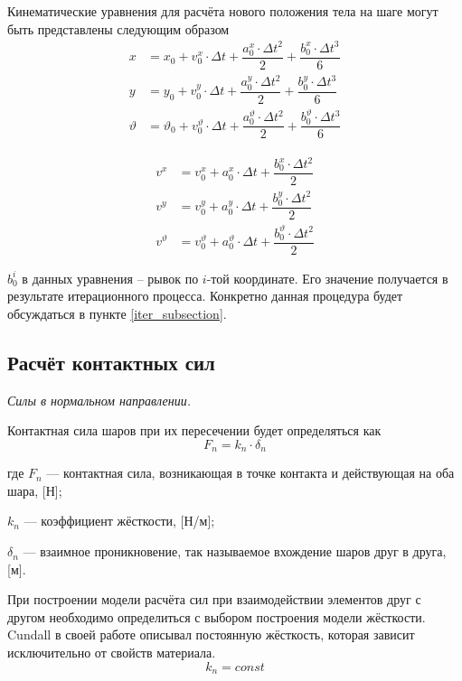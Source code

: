 \documentclass[utf8x, 14pt, oneside, a4paper]{article}
\begin{document}
Кинематические уравнения для расчёта нового положения тела на шаге могут быть представлены следующим образом
\begin{align}
x &= x_0 + v^x_0 \cdot \Delta t + \dfrac{a^x_0 \cdot \Delta t^2}{2} + \dfrac{b^x_0 \cdot \Delta t^3}{6}\\
y &= y_0 + v^y_0 \cdot \Delta t + \dfrac{a^y_0 \cdot \Delta t^2}{2} + \dfrac{b^y_0 \cdot \Delta t^3}{6}\\
\vartheta &= \vartheta_0 + v^{\vartheta}_0 \cdot \Delta t + \dfrac{a^{\vartheta}_0 \cdot \Delta t^2}{2} + \dfrac{b^{\vartheta}_0 \cdot \Delta t^3}{6}
\end{align}

\begin{align}
v^x &= v^x_0 + a^x_0 \cdot \Delta t + \dfrac{b^x_0 \cdot \Delta t^2}{2}\\
v^y &= v^y_0 + a^y_0 \cdot \Delta t + \dfrac{b^y_0 \cdot \Delta t^2}{2}\\
v^{\vartheta} &= v^{\vartheta}_0 + a^{\vartheta}_0 \cdot \Delta t + \dfrac{b^{\vartheta}_0 \cdot \Delta t^2}{2}
\end{align}


$b_0^i$ в данных уравнения -- рывок по $i$-той координате. 
Его значение получается в результате итерационного процесса.
Конкретно данная процедура будет обсуждаться в пункте \ref{iter_subsection}.



\subsection{Расчёт контактных сил}
\label{force_subsection}

\textit{Силы в нормальном направлении.}

Контактная сила шаров при их пересечении будет определяться как
\begin{equation}
\label{norm_force}
F_n = k_n \cdot \delta_n
\end{equation}

где $F_n$ --- контактная сила, возникающая в точке контакта и действующая на оба шара, [Н];

$k_n$ --- коэффициент жёсткости, [Н/м];

$\delta_n$ --- взаимное проникновение, так называемое вхождение шаров друг в друга, [м].

При построении модели расчёта сил при взаимодействии элементов друг с другом необходимо определиться с выбором построения модели жёсткости. 
Cundall в своей работе \cite{cundall} описывал постоянную жёсткость, которая зависит исключительно от свойств материала.
\begin{equation}
\label{kn_const}
k_n = const
\end{equation}
\end{document}
